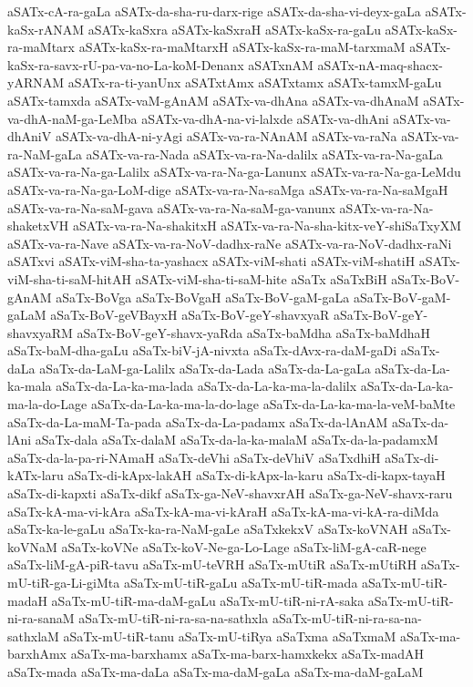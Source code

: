 {aSATx-cA-ra-gaLa
aSATx-da-sha-ru-darx-rige
aSATx-da-sha-vi-deyx-gaLa
aSATx-kaSx-rANAM
aSATx-kaSxra
aSATx-kaSxraH
aSATx-kaSx-ra-gaLu
aSATx-kaSx-ra-maMtarx
aSATx-kaSx-ra-maMtarxH
aSATx-kaSx-ra-maM-tarxmaM
aSATx-kaSx-ra-savx-rU-pa-va-no-La-koM-Denanx
aSATxnAM
aSATx-nA-maq-shacx-yARNAM
aSATx-ra-ti-yanUnx
aSATxtAmx
aSATxtamx
aSATx-tamxM-gaLu
aSATx-tamxda
aSATx-vaM-gAnAM
aSATx-va-dhAna
aSATx-va-dhAnaM
aSATx-va-dhA-naM-ga-LeMba
aSATx-va-dhA-na-vi-lalxde
aSATx-va-dhAni
aSATx-va-dhAniV
aSATx-va-dhA-ni-yAgi
aSATx-va-ra-NAnAM
aSATx-va-raNa
aSATx-va-ra-NaM-gaLa
aSATx-va-ra-Nada
aSATx-va-ra-Na-dalilx
aSATx-va-ra-Na-gaLa
aSATx-va-ra-Na-ga-Lalilx
aSATx-va-ra-Na-ga-Lanunx
aSATx-va-ra-Na-ga-LeMdu
aSATx-va-ra-Na-ga-LoM-dige
aSATx-va-ra-Na-saMga
aSATx-va-ra-Na-saMgaH
aSATx-va-ra-Na-saM-gava
aSATx-va-ra-Na-saM-ga-vanunx
aSATx-va-ra-Na-shaketxVH
aSATx-va-ra-Na-shakitxH
aSATx-va-ra-Na-sha-kitx-veY-shiSaTxyXM
aSATx-va-ra-Nave
aSATx-va-ra-NoV-dadhx-raNe
aSATx-va-ra-NoV-dadhx-raNi
aSATxvi
aSATx-viM-sha-ta-yashacx
aSATx-viM-shati
aSATx-viM-shatiH
aSATx-viM-sha-ti-saM-hitAH
aSATx-viM-sha-ti-saM-hite
aSaTx
aSaTxBiH
aSaTx-BoV-gAnAM
aSaTx-BoVga
aSaTx-BoVgaH
aSaTx-BoV-gaM-gaLa
aSaTx-BoV-gaM-gaLaM
aSaTx-BoV-geVBayxH
aSaTx-BoV-geY-shavxyaR
aSaTx-BoV-geY-shavxyaRM
aSaTx-BoV-geY-shavx-yaRda
aSaTx-baMdha
aSaTx-baMdhaH
aSaTx-baM-dha-gaLu
aSaTx-biV-jA-nivxta
aSaTx-dAvx-ra-daM-gaDi
aSaTx-daLa
aSaTx-da-LaM-ga-Lalilx
aSaTx-da-Lada
aSaTx-da-La-gaLa
aSaTx-da-La-ka-mala
aSaTx-da-La-ka-ma-lada
aSaTx-da-La-ka-ma-la-dalilx
aSaTx-da-La-ka-ma-la-do-Lage
aSaTx-da-La-ka-ma-la-do-lage
aSaTx-da-La-ka-ma-la-veM-baMte
aSaTx-da-La-maM-Ta-pada
aSaTx-da-La-padamx
aSaTx-da-lAnAM
aSaTx-da-lAni
aSaTx-dala
aSaTx-dalaM
aSaTx-da-la-ka-malaM
aSaTx-da-la-padamxM
aSaTx-da-la-pa-ri-NAmaH
aSaTx-deVhi
aSaTx-deVhiV
aSaTxdhiH
aSaTx-di-kATx-laru
aSaTx-di-kApx-lakAH
aSaTx-di-kApx-la-karu
aSaTx-di-kapx-tayaH
aSaTx-di-kapxti
aSaTx-dikf
aSaTx-ga-NeV-shavxrAH
aSaTx-ga-NeV-shavx-raru
aSaTx-kA-ma-vi-kAra
aSaTx-kA-ma-vi-kAraH
aSaTx-kA-ma-vi-kA-ra-diMda
aSaTx-ka-le-gaLu
aSaTx-ka-ra-NaM-gaLe
aSaTxkekxV
aSaTx-koVNAH
aSaTx-koVNaM
aSaTx-koVNe
aSaTx-koV-Ne-ga-Lo-Lage
aSaTx-liM-gA-caR-nege
aSaTx-liM-gA-piR-tavu
aSaTx-mU-teVRH
aSaTx-mUtiR
aSaTx-mUtiRH
aSaTx-mU-tiR-ga-Li-giMta
aSaTx-mU-tiR-gaLu
aSaTx-mU-tiR-mada
aSaTx-mU-tiR-madaH
aSaTx-mU-tiR-ma-daM-gaLu
aSaTx-mU-tiR-ni-rA-saka
aSaTx-mU-tiR-ni-ra-sanaM
aSaTx-mU-tiR-ni-ra-sa-na-sathxla
aSaTx-mU-tiR-ni-ra-sa-na-sathxlaM
aSaTx-mU-tiR-tanu
aSaTx-mU-tiRya
aSaTxma
aSaTxmaM
aSaTx-ma-barxhAmx
aSaTx-ma-barxhamx
aSaTx-ma-barx-hamxkekx
aSaTx-madAH
aSaTx-mada
aSaTx-ma-daLa
aSaTx-ma-daM-gaLa
aSaTx-ma-daM-gaLaM
}
